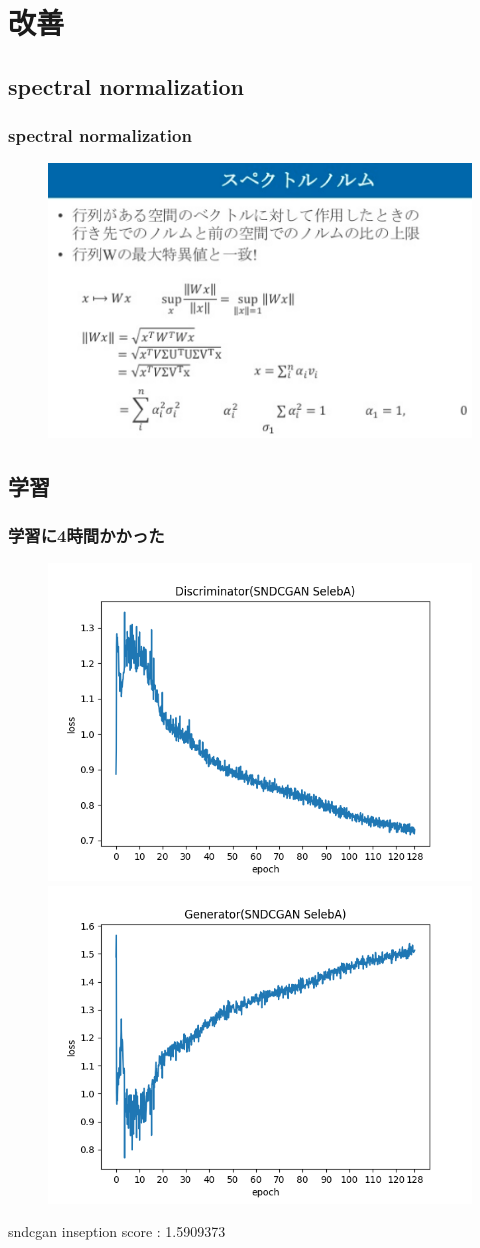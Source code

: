 \documentclass[dvipdfmx,12pt]{beamer}
\begin{document}
\section{改善}
\subsection{spectral normalization}
\begin{frame}
	\frametitle{spectral normalization}
	\begin{figure}[htbp]
	\begin{center}
	\includegraphics[width=\hsize]{./spec_dis.png}
	\end{center}
	\end{figure}
\end{frame}

\subsection{学習}
\begin{frame}
	\frametitle{学習に4時間かかった}
	\begin{figure}[htbp]
	\begin{center}
	\includegraphics[width=0.5\hsize]{./sndcgan_D.png}
	\includegraphics[width=0.5\hsize]{./sndcgan_G.png}
	\end{center}
	\end{figure}
	sndcgan inseption score : 1.5909373
\end{frame}
\end{document}

